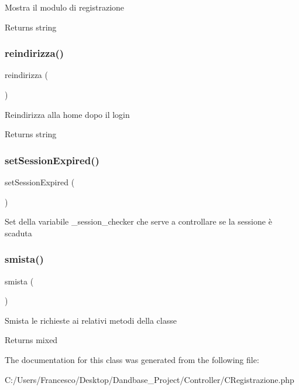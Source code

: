 Mostra il modulo di registrazione

\begin{DoxyReturn}{Returns}
string 
\end{DoxyReturn}
\mbox{\label{class_c_registrazione_a29bdc8fd7986f73f25db00b8461b1555}} 
\subsubsection{\texorpdfstring{reindirizza()}{reindirizza()}}
{\footnotesize\ttfamily reindirizza (\begin{DoxyParamCaption}{ }\end{DoxyParamCaption})}

Reindirizza alla home dopo il login

\begin{DoxyReturn}{Returns}
string 
\end{DoxyReturn}
\mbox{\label{class_c_registrazione_aee0ceb27c20213e8f77ae843cd1c0176}} 
\subsubsection{\texorpdfstring{set\+Session\+Expired()}{setSessionExpired()}}
{\footnotesize\ttfamily set\+Session\+Expired (\begin{DoxyParamCaption}{ }\end{DoxyParamCaption})}

Set della variabile \+\_\+session\+\_\+checker che serve a controllare se la sessione è scaduta \mbox{\label{class_c_registrazione_afc7ba180569cef3535974cfc4a1211f1}} 
\subsubsection{\texorpdfstring{smista()}{smista()}}
{\footnotesize\ttfamily smista (\begin{DoxyParamCaption}{ }\end{DoxyParamCaption})}

Smista le richieste ai relativi metodi della classe

\begin{DoxyReturn}{Returns}
mixed 
\end{DoxyReturn}


The documentation for this class was generated from the following file\+:\begin{DoxyCompactItemize}
\item 
C\+:/\+Users/\+Francesco/\+Desktop/\+Dandbase\+\_\+\+Project/\+Controller/C\+Registrazione.\+php\end{DoxyCompactItemize}
